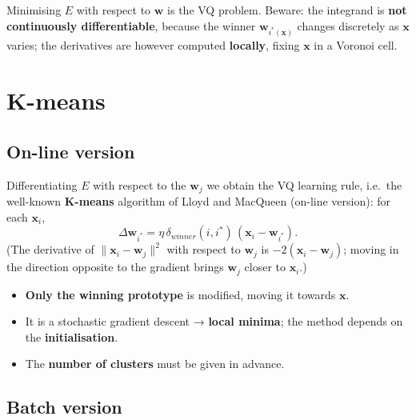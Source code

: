 Minimising \(E\) with respect to \(\mathbf{w}\) is the VQ problem.
Beware: the integrand is \textbf{not continuously differentiable},
because the winner \(\mathbf{w}_{i^*(\mathbf{x})}\) changes discretely
as \(\mathbf{x}\) varies; the derivatives are however computed
\textbf{locally}, fixing \(\mathbf{x}\) in a Voronoi cell.

\section{K-means}\label{k-means}

\subsection{On-line version}\label{versione-on-line}

Differentiating \(E\) with respect to the \(\mathbf{w}_j\) we obtain the
VQ learning rule, i.e.\ the well-known \textbf{K-means} algorithm of
Lloyd and MacQueen (on-line version): for each \(\mathbf{x}_i\), \[
\Delta\mathbf{w}_{i^*} = \eta\,\delta_{winner}(i, i^*)\,(\mathbf{x}_i - \mathbf{w}_{i^*}).
\] (The derivative of \(\|\mathbf{x}_i - \mathbf{w}_j\|^2\) with
respect to \(\mathbf{w}_j\) is \(-2(\mathbf{x}_i - \mathbf{w}_j)\);
moving in the direction opposite to the gradient brings \(\mathbf{w}_j\)
closer to \(\mathbf{x}_i\).)

\begin{itemize}
\tightlist
\item
  \textbf{Only the winning prototype} is modified, moving it towards
  \(\mathbf{x}\).
\item
  It is a stochastic gradient descent → \textbf{local minima}; the
  method depends on the \textbf{initialisation}.
\item
  The \textbf{number of clusters} must be given in advance.
\end{itemize}

\subsection{Batch version}\label{versione-batch}

